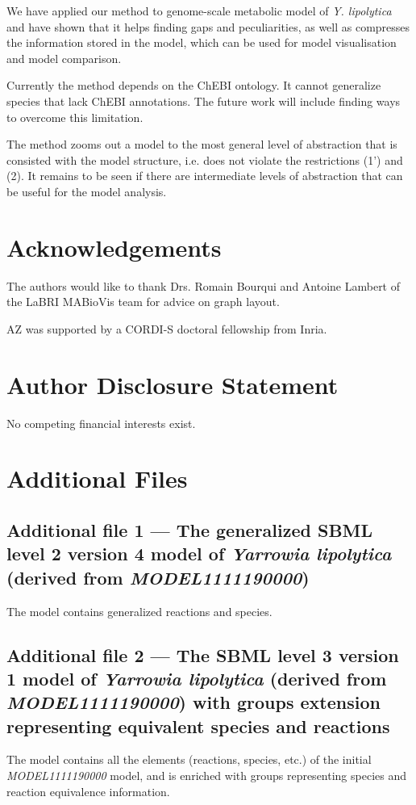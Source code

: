 \documentclass[9pt]{article}
\newcounter{rm}
\begin{document}
We have applied our method to genome-scale metabolic model of \emph{Y. lipolytica} and have shown that it helps finding gaps and peculiarities, as well as compresses the information stored in the model, which can be used for model visualisation and model comparison.

Currently the method depends on the ChEBI ontology. It cannot generalize species that lack ChEBI annotations. The future work will include finding ways to overcome this limitation.

The method zooms out a model to the most general level of abstraction that is consisted with the model structure, i.e. does not violate the restrictions (1') and (2). It remains to be seen if there are intermediate levels of abstraction that can be useful for the model analysis. 

\bigskip

\section*{Acknowledgements}
  The authors would like to thank Drs. Romain Bourqui and Antoine Lambert of the LaBRI MABioVis team for advice on graph layout.
  
  AZ was supported by a CORDI-S doctoral fellowship from Inria.

\section*{Author Disclosure Statement}
No competing financial interests exist.

\newpage
 


\section*{Additional Files}
  \subsection*{Additional file 1 --- The generalized SBML level 2 version 4 model of \textit{Yarrowia lipolytica} (derived from \emph{MODEL1111190000})}
    The model contains generalized reactions and species.
    
  \subsection*{Additional file 2 --- The SBML level 3 version 1 model of \textit{Yarrowia lipolytica} (derived from \emph{MODEL1111190000}) with groups extension representing equivalent species and reactions}
    The model contains all the elements (reactions, species, etc.) of the initial \emph{MODEL1111190000} model, and is enriched with groups representing species and reaction equivalence information.
    
    
\end{document}
